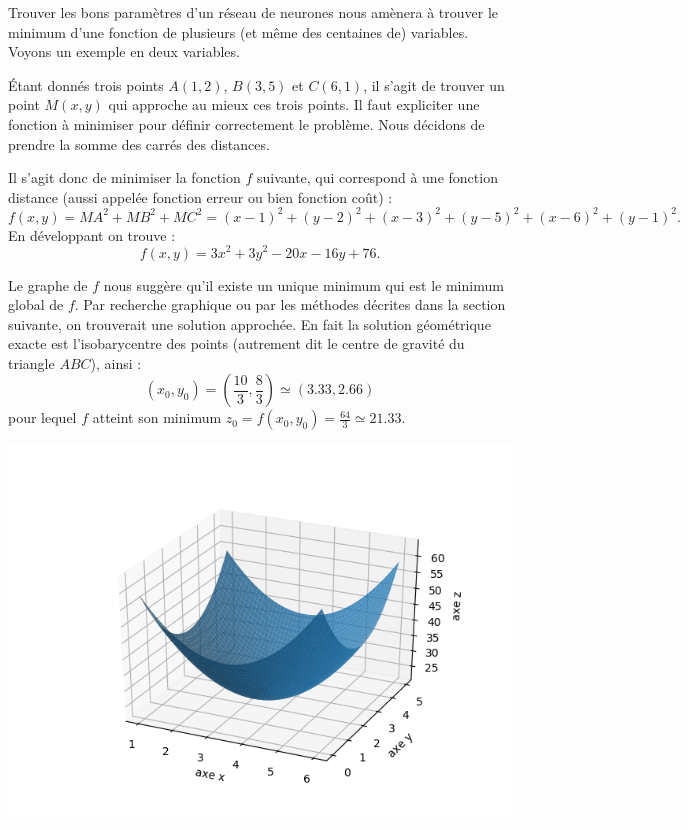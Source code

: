 \documentclass[11pt,class=report,crop=false]{standalone}
\begin{document}
Trouver les bons paramètres d'un réseau de neurones nous amènera à trouver le minimum d'une fonction de plusieurs (et même des centaines de) variables. Voyons un exemple en deux variables.
\begin{exemple}
Étant donnés trois points $A(1,2)$, $B(3,5)$ et $C(6,1)$, il s'agit de trouver un point $M(x,y)$ qui \og{}approche au mieux\fg{} ces trois points. Il faut expliciter une fonction à minimiser pour définir correctement le problème. Nous décidons de prendre la somme des carrés des distances.


   
Il s'agit donc de minimiser la fonction $f$ suivante, qui correspond à une fonction distance (aussi appelée fonction erreur ou bien fonction coût) :
$$f(x,y) = MA^2+MB^2+MC^2 = 
(x-1)^2+ (y-2)^2 + (x-3)^2 + (y-5)^2 + (x-6)^2 + (y-1)^2.$$
En développant on trouve :
$$f(x,y) = 3x^2 + 3y^2 - 20x - 16y + 76.$$

Le graphe de $f$ nous suggère qu'il existe un unique minimum qui est le minimum global de $f$. 
 Par recherche graphique ou par les méthodes décrites dans la section suivante, on trouverait une solution approchée. En fait la solution géométrique exacte est l'isobarycentre des points (autrement dit le centre de gravité du triangle $ABC$), ainsi :
 $$(x_0,y_0) = \left(\frac{10}{3},\frac83\right) \simeq (3.33,2.66)$$
 pour lequel $f$ atteint son minimum $z_0 = f(x_0,y_0) = \frac{64}{3} \simeq 21.33$.

\begin{center}
\includegraphics[scale=\myscale,scale=0.7]{figures/fonctions-surface-4}
\end{center}


\end{exemple}
\end{document}
